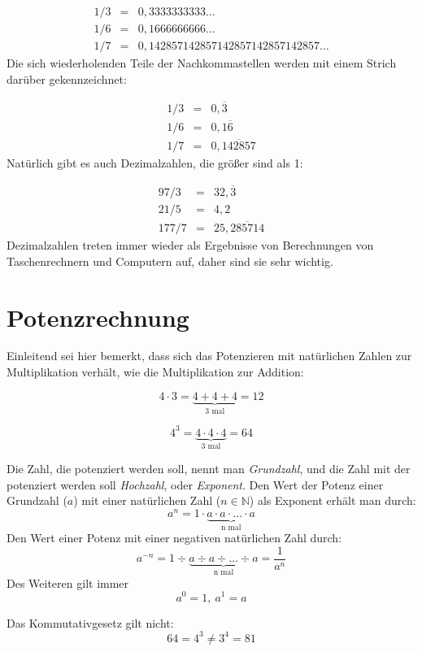 \begin{eqnarray*}
1/3 &=& 0,3333333333\dots \\
1/6 &=& 0,1666666666\dots \\
1/7 &=& 0,142857142857142857142857142857\dots
\end{eqnarray*}
Die sich wiederholenden Teile der Nachkommastellen werden mit einem Strich darüber gekennzeichnet:

\begin{eqnarray*}
1/3 &=& 0,\overline{3} \\
1/6 &=& 0,1\overline{6} \\
1/7 &=& 0,\overline{142857}
\end{eqnarray*}
Natürlich gibt es auch Dezimalzahlen, die größer sind als 1:

\begin{eqnarray*}
97/3 &=& 32,\overline{3} \\
21/5 &=& 4,2 \\
177/7 &=& 25,\overline{285714}
\end{eqnarray*}
Dezimalzahlen treten immer wieder als Ergebnisse von Berechnungen von Taschenrechnern und Computern auf, daher sind sie sehr wichtig. 


\section{Potenzrechnung}

Einleitend sei hier bemerkt, dass sich das Potenzieren mit natürlichen Zahlen zur Multiplikation verhält, wie die Multiplikation zur Addition:

\[ 4\cdot 3 = \underbrace{4+4+4}_{\text{3 mal}} = 12 \]

\[ 4^3 = \underbrace{4\cdot 4\cdot 4}_{\text{3 mal}} = 64 \]

\begin{definition}
Die Zahl, die potenziert werden soll, nennt man \textsl{Grundzahl}, und die Zahl mit der potenziert werden soll \textsl{Hochzahl}, oder \textsl{Exponent}. Den Wert der Potenz einer Grundzahl ($a$) mit einer natürlichen Zahl ($n \in \mathbb{N}$) als Exponent erhält man durch:
\[ a^n = 1\cdot \underbrace{a\cdot a \cdot \dots \cdot a}_{\text{n mal}} \]
Den Wert einer Potenz mit einer negativen natürlichen Zahl durch:
\[ a^{-n} = 1 \div \underbrace{a\div a \div \dots \div a}_{\text{n mal}} = \frac{1}{a^n} \]
Des Weiteren gilt immer
\[ a^0 = 1,\ a^1=a \]
\end{definition}
Das Kommutativgesetz gilt nicht:
\[ 64 = 4^3 \ne 3^4 = 81 \]


